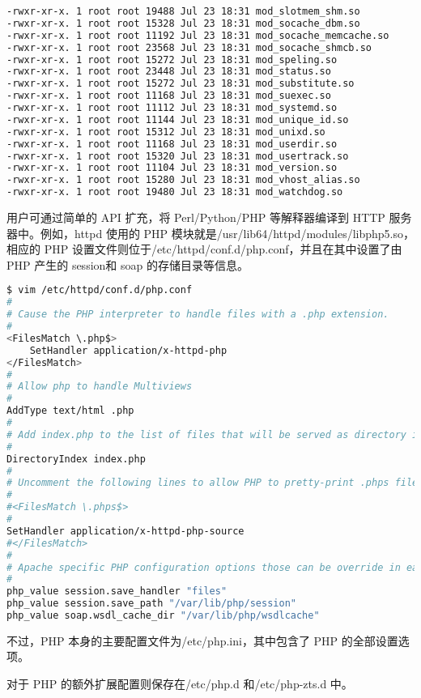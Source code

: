 \begin{lstlisting}[language=bash]
-rwxr-xr-x. 1 root root 19488 Jul 23 18:31 mod_slotmem_shm.so
-rwxr-xr-x. 1 root root 15328 Jul 23 18:31 mod_socache_dbm.so
-rwxr-xr-x. 1 root root 11192 Jul 23 18:31 mod_socache_memcache.so
-rwxr-xr-x. 1 root root 23568 Jul 23 18:31 mod_socache_shmcb.so
-rwxr-xr-x. 1 root root 15272 Jul 23 18:31 mod_speling.so
-rwxr-xr-x. 1 root root 23448 Jul 23 18:31 mod_status.so
-rwxr-xr-x. 1 root root 15272 Jul 23 18:31 mod_substitute.so
-rwxr-xr-x. 1 root root 11168 Jul 23 18:31 mod_suexec.so
-rwxr-xr-x. 1 root root 11112 Jul 23 18:31 mod_systemd.so
-rwxr-xr-x. 1 root root 11144 Jul 23 18:31 mod_unique_id.so
-rwxr-xr-x. 1 root root 15312 Jul 23 18:31 mod_unixd.so
-rwxr-xr-x. 1 root root 11168 Jul 23 18:31 mod_userdir.so
-rwxr-xr-x. 1 root root 15320 Jul 23 18:31 mod_usertrack.so
-rwxr-xr-x. 1 root root 11104 Jul 23 18:31 mod_version.so
-rwxr-xr-x. 1 root root 15280 Jul 23 18:31 mod_vhost_alias.so
-rwxr-xr-x. 1 root root 19480 Jul 23 18:31 mod_watchdog.so
\end{lstlisting}

用户可通过简单的 API 扩充，将 Perl/Python/PHP 等解释器编译到 HTTP 服务器中。例如，httpd 使用的 PHP 模块就是/usr/lib64/httpd/modules/libphp5.so，相应的 PHP 设置文件则位于/etc/httpd/conf.d/php.conf，并且在其中设置了由 PHP 产生的 session和 soap 的存储目录等信息。


\begin{lstlisting}[language=bash]
$ vim /etc/httpd/conf.d/php.conf
#
# Cause the PHP interpreter to handle files with a .php extension.
#
<FilesMatch \.php$>
	SetHandler application/x-httpd-php
</FilesMatch>
#
# Allow php to handle Multiviews
#
AddType text/html .php
#
# Add index.php to the list of files that will be served as directory indexes.
#
DirectoryIndex index.php
#
# Uncomment the following lines to allow PHP to pretty-print .phps files as PHP source code:
#
#<FilesMatch \.phps$>
#
SetHandler application/x-httpd-php-source
#</FilesMatch>
#
# Apache specific PHP configuration options those can be override in each configured vhost
#
php_value session.save_handler "files"
php_value session.save_path "/var/lib/php/session"
php_value soap.wsdl_cache_dir "/var/lib/php/wsdlcache"
\end{lstlisting}

不过，PHP 本身的主要配置文件为/etc/php.ini，其中包含了 PHP 的全部设置选项。

对于 PHP 的额外扩展配置则保存在/etc/php.d 和/etc/php-zts.d 中。



